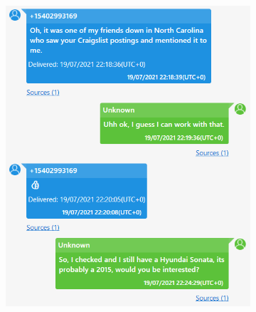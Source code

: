 \documentclass[12pt]{article}
\begin{document}
\begin{figure}[!ht]
\begin{subfigure}[b]{0.3\textwidth}
        \includegraphics[width=\textwidth]{images/ss2.png}
        \caption{}
    \end{subfigure}
    \hspace{2 pt}
    \begin{subfigure}[b]{0.3\textwidth}
        \centering

\end{subfigure}
\end{figure}
\end{document}
